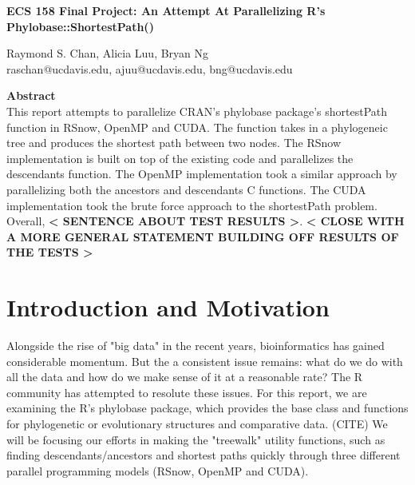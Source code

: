 \documentclass[11pt,letterpaper]{article}
\begin{document}
\begin{center}
{\huge \textbf{ECS 158 Final Project: An Attempt At Parallelizing R's Phylobase::ShortestPath()}\\
\vspace{5mm}
\begin{Large}
Raymond S. Chan, Alicia Luu, Bryan Ng\\
raschan@ucdavis.edu, ajuu@ucdavis.edu, bng@ucdavis.edu\\
\end{Large}}
\end{center}


\vspace{5mm}

\begin{center}
	\begin{large}
		\textbf{Abstract}\\
		This report attempts to parallelize CRAN's phylobase package's shortestPath function in RSnow, OpenMP and CUDA. The function takes in a phylogeneic tree and produces the shortest path between two nodes. The RSnow implementation is built on top of the existing code and parallelizes the descendants function. The OpenMP implementation took a similar approach by parallelizing both the ancestors and descendants C functions. The CUDA implementation took the brute force approach to the  shortestPath problem. Overall, \textbf{< SENTENCE ABOUT TEST RESULTS >}. \textbf{< CLOSE WITH A MORE GENERAL STATEMENT BUILDING OFF RESULTS OF THE TESTS >} 
	\end{large}
	

\end{center}

\section{Introduction and Motivation}
 
Alongside the rise of "big data" in the recent years, bioinformatics has gained considerable momentum. But the a consistent issue remains: what do we do with all the data and how do we make sense of it at a reasonable rate? The R community has attempted to resolute these issues. For this report, we are examining the R's phylobase package, which provides the base class and functions for phylogenetic or evolutionary structures and comparative data. (CITE) We will be focusing our efforts in making the "treewalk" utility functions, such as finding descendants/ancestors and shortest paths quickly through three different parallel programming models (RSnow, OpenMP and CUDA).  
\end{document}
